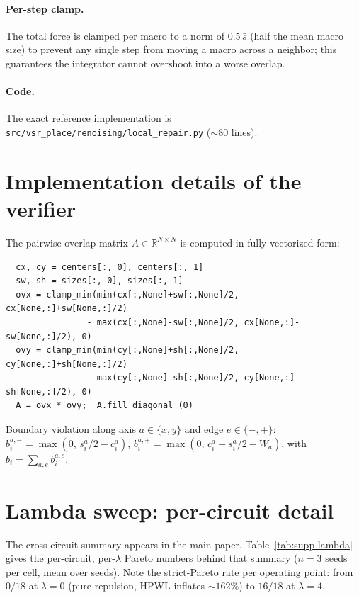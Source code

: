 \documentclass{article}
\begin{document}
\paragraph{Per-step clamp.}  The total force is clamped per macro to a
norm of $0.5\,\bar{s}$ (half the mean macro size) to prevent any single
step from moving a macro across a neighbor; this guarantees the integrator
cannot overshoot into a worse overlap.

\paragraph{Code.}  The exact reference implementation is
\texttt{src/vsr\_place/renoising/local\_repair.py} ($\sim 80$ lines).

\section{Implementation details of the verifier}
\label{sec:supp-verifier}

The pairwise overlap matrix $A \in \mathbb{R}^{N \times N}$ is computed in
fully vectorized form:
\begin{verbatim}
  cx, cy = centers[:, 0], centers[:, 1]
  sw, sh = sizes[:, 0], sizes[:, 1]
  ovx = clamp_min(min(cx[:,None]+sw[:,None]/2, cx[None,:]+sw[None,:]/2)
                - max(cx[:,None]-sw[:,None]/2, cx[None,:]-sw[None,:]/2), 0)
  ovy = clamp_min(min(cy[:,None]+sh[:,None]/2, cy[None,:]+sh[None,:]/2)
                - max(cy[:,None]-sh[:,None]/2, cy[None,:]-sh[None,:]/2), 0)
  A = ovx * ovy;  A.fill_diagonal_(0)
\end{verbatim}
Boundary violation along axis $a \in \{x,y\}$ and edge $e \in \{-,+\}$:
$b_i^{a,-} = \max(0,\, s_i^a/2 - c_i^a)$,
$b_i^{a,+} = \max(0,\, c_i^a + s_i^a/2 - W_a)$, with
$b_i = \sum_{a,e} b_i^{a,e}$.

\section{Lambda sweep: per-circuit detail}
\label{sec:supp-lambda}

The cross-circuit summary appears in the main paper.  Table~\ref{tab:supp-lambda}
gives the per-circuit, per-$\lambda$ Pareto numbers behind that summary
($n=3$ seeds per cell, mean over seeds).  Note the strict-Pareto rate per
operating point: from $0/18$ at $\lambda=0$ (pure repulsion, HPWL inflates
$\sim 162\%$) to $16/18$ at $\lambda=4$.
\end{document}
